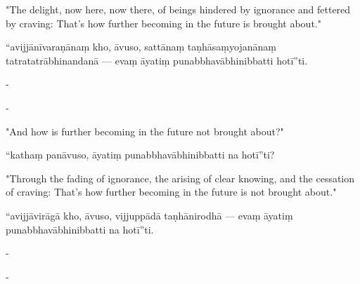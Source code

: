\begin{samepage}
\begin{leftcolumn*}
"The delight, now here, now there, of beings hindered by ignorance and fettered by craving: That's how further becoming in the future is brought about."
\end{leftcolumn*}

\begin{rightcolumn}
“avijjānīvaraṇānaṃ kho, āvuso, sattānaṃ taṇhāsaṃyojanānaṃ tatratatrābhinandanā — evaṃ āyatiṃ punabbhavābhinibbatti hotī”ti.
\end{rightcolumn}
\end{samepage}

\begin{samepage}
\begin{leftcolumn*}
-
\end{leftcolumn*}

\begin{rightcolumn}
-
\end{rightcolumn}
\end{samepage}

\begin{samepage}
\begin{leftcolumn*}
"And how is further becoming in the future not brought about?"
\end{leftcolumn*}

\begin{rightcolumn}
“kathaṃ panāvuso, āyatiṃ punabbhavābhinibbatti na hotī”ti?
\end{rightcolumn}
\end{samepage}

\begin{samepage}
\begin{leftcolumn*}
"Through the fading of ignorance, the arising of clear knowing, and the cessation of craving: That's how further becoming in the future is not brought about."
\end{leftcolumn*}

\begin{rightcolumn}
“avijjāvirāgā kho, āvuso, vijjuppādā taṇhānirodhā — evaṃ āyatiṃ punabbhavābhinibbatti na hotī”ti.
\end{rightcolumn}
\end{samepage}

\begin{samepage}
\begin{leftcolumn*}
-
\end{leftcolumn*}

\begin{rightcolumn}
-
\end{rightcolumn}
\end{samepage}

